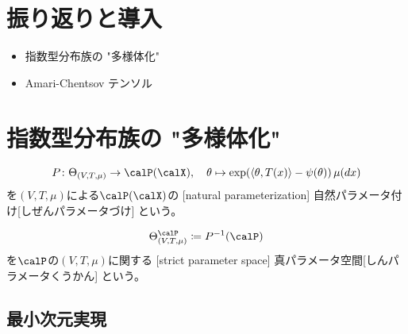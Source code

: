 \documentclass[report]{jlreq}
\begin{document}
%

%
\section{振り返りと導入}

\begin{itemize}
    \item 指数型分布族の "多様体化"
    \item Amari-Chentsov テンソル
\end{itemize}

%
\section{指数型分布族の "多様体化"}

\begin{definition}[自然パラメータ付け]
    \begin{equation}
        P \colon \Theta_{(V, T, \mu)} \to \calP(\calX),
            \quad
            \theta
            \mapsto
            \exp (\myangle{\theta}{T(x)} - \psi(\theta)) \, \mu(dx)
    \end{equation}
    を$(V, T, \mu)$による$\calP(\calX)$の
    [natural parameterization]
        {自然パラメータ付け}[しぜんパラメータづけ]
    という。
\end{definition}

\begin{definition}[真パラメータ空間]
    \begin{equation}
        \Theta^\calP_{(V, T, \mu)}
            \coloneqq P^{-1}(\calP)
    \end{equation}
    を$\calP$の$(V, T, \mu)$に関する
    [strict parameter space]
        {真パラメータ空間}[しんパラメータくうかん]
    という。
\end{definition}

\subsection{最小次元実現}
\end{document}
